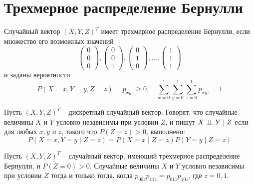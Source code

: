 \section{Трехмерное распределение Бернулли}

\begin{definition}
    Случайный вектор $(X,Y,Z)^T$ имеет трехмерное распределение Бернулли,
    если множество его возможных значений
    $$
        \begin{pmatrix}
            0 \\
            0 \\
            0
        \end{pmatrix},
        \begin{pmatrix}
            0 \\
            0 \\
            1
        \end{pmatrix},
        \begin{pmatrix}
            0 \\
            1 \\
            0
        \end{pmatrix}, \ldots, \begin{pmatrix}
            1 \\
            1 \\
            1
        \end{pmatrix}
    $$ и заданы вероятности
    $$P(X=x,Y=y,Z=z)=p_{xyz} \geq 0, \quad \sum_{x=0}^{1}\sum_{y=0}^{1}\sum_{z=0}^{1}p_{xyz}=1$$
\end{definition}

\begin{definition}
    Пусть $(X,Y,Z)^T$ -- дискретный случайный вектор.
    Говорят, что случайные величины $X$ и $Y$ условно независимы при условии $Z$,
    и пишут $X \perp\!\!\!\perp Y \mid Z$ если
    для любых $x,y$ и $z$, такого что $P(Z=z)>0$, выполнено:
    $$
        P(X=x, Y=y \mid Z = z) = P(X=x \mid Z = z) P(Y=y \mid Z = z)
    $$
\end{definition}

\begin{theorem}\label{thm1}
    Пусть $(X,Y,Z)^T$ -- случайный вектор, имеющий трехмерное распределение Бернулли, и $P(Z=0)>0$.
    Случайные величины $X$ и $Y$ условно независимы при условии $Z$ тогда и только тогда, когда
    $p_{00z}p_{11z}=p_{01z}p_{10z}$, где $z=0,1$.
\end{theorem}

